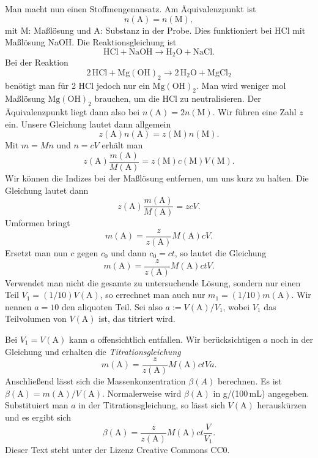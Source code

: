 \documentclass[a4paper,11pt,fleqn,twocolumn]{article}
\begin{document}
Man macht nun einen Stoffmengenansatz. Am Äquivalenzpunkt ist
\begin{equation}
n(\mathrm A)=n(\mathrm M),
\end{equation}
mit M: Maßlösung und A: Substanz in der Probe.
Dies funktioniert bei HCl mit Maßlösung NaOH.
Die Reaktionsgleichung ist
\[\mathrm{HCl + NaOH \longrightarrow H_2O + NaCl}.\]
Bei der Reaktion
\[\mathrm{2\,HCl + Mg(OH)_2 \longrightarrow 2\,H_2O + MgCl_2}\]
benötigt man für 2 HCl jedoch nur ein $\mathrm{Mg(OH)_2}$.
Man wird weniger mol Maßlösung $\mathrm{Mg(OH)_2}$ brauchen,
um die HCl zu neutralisieren. Der Äquivalenzpunkt liegt
dann also bei $n(\mathrm A)=2n(\mathrm M)$. Wir führen eine Zahl
$z$ ein. Unsere Gleichung lautet dann allgemein
\begin{equation}
z(\mathrm A)n(\mathrm A) = z(\mathrm M)n(\mathrm M).
\end{equation}
Mit $m=Mn$ und $n=cV$ erhält man
\begin{equation}
z(\mathrm A)\frac{m(\mathrm A)}{M(\mathrm A)}
= z(\mathrm M)c(\mathrm M)V(\mathrm M).
\end{equation}
Wir können die Indizes bei der Maßlösung entfernen, um
uns kurz zu halten. Die Gleichung lautet dann
\begin{equation}
z(\mathrm A)\frac{m(\mathrm A)}{M(\mathrm A)} = zcV.
\end{equation}
Umformen bringt
\begin{equation}
m(\mathrm A) = \frac{z}{z(\mathrm A)} M(\mathrm A) cV.
\end{equation}
Ersetzt man nun $c$ gegen $c_0$ und dann $c_0=ct$,
so lautet die Gleichung
\begin{equation}
m(\mathrm A) = \frac{z}{z(\mathrm A)} M(\mathrm A) ctV.
\end{equation}
Verwendet man nicht die gesamte zu untersuchende Lösung, sondern
nur einen Teil $V_1 = (1/10)V(\mathrm A)$, so errechnet man auch nur
$m_1 = (1/10)m(\mathrm A)$. Wir nennen $a=10$ den aliquoten Teil.
Sei also $a:=V(\mathrm A)/V_1$, wobei $V_1$ das Teilvolumen von
$V(\mathrm A)$ ist, das titriert wird.

Bei $V_1=V(\mathrm A)$ kann $a$ offensichtlich entfallen.
Wir berücksichtigen $a$ noch in der Gleichung und erhalten
die \emph{Titrationsgleichung}
\begin{equation}
m(\mathrm A) = \frac{z}{z(\mathrm A)} M(\mathrm A)ctVa.
\end{equation}
Anschließend lässt sich die Massenkonzentration $\beta(A)$ berechnen.
Es ist $\beta(\mathrm A) = m(\mathrm A)/V(\mathrm A)$.
Normalerweise wird $\beta(\mathrm A)$ in g/(100\,mL) angegeben.
Substituiert man $a$ in der Titrationsgleichung, so lässt sich
$V(\mathrm A)$ herauskürzen und es ergibt sich
\begin{equation}
\beta(\mathrm A) = \frac{z}{z(\mathrm A)} M(\mathrm A) ct\frac{V}{V_1}.
\end{equation}
{\small Dieser Text steht unter der Lizenz Creative Commons CC0.}
\end{document}
